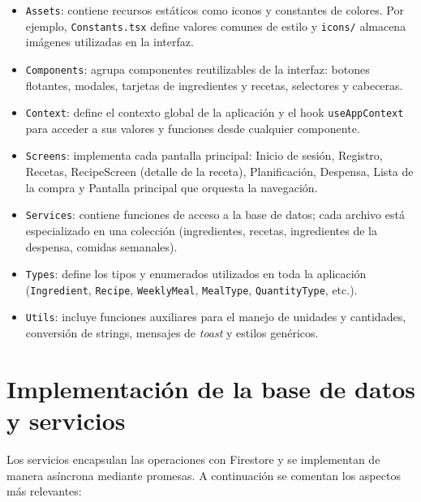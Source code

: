 \documentclass[twoside, openright, 11pt]{report}
\begin{document}
\begin{itemize}
  \item \texttt{Assets}: contiene recursos estáticos como iconos y constantes de colores. Por ejemplo, \texttt{Constants.tsx} define valores comunes de estilo y \texttt{icons/} almacena imágenes utilizadas en la interfaz.
  \item \texttt{Components}: agrupa componentes reutilizables de la interfaz: botones flotantes, modales, tarjetas de ingredientes y recetas, selectores y cabeceras.
  \item \texttt{Context}: define el contexto global de la aplicación y el hook \texttt{useAppContext} para acceder a sus valores y funciones desde cualquier componente.
  \item \texttt{Screens}: implementa cada pantalla principal: Inicio de sesión, Registro, Recetas, RecipeScreen (detalle de la receta), Planificación, Despensa, Lista de la compra y Pantalla principal que orquesta la navegación.
  \item \texttt{Services}: contiene funciones de acceso a la base de datos; cada archivo está especializado en una colección (ingredientes, recetas, ingredientes de la despensa, comidas semanales).
  \item \texttt{Types}: define los tipos y enumerados utilizados en toda la aplicación (\texttt{Ingredient}, \texttt{Recipe}, \texttt{WeeklyMeal}, \texttt{MealType}, \texttt{QuantityType}, etc.).
  \item \texttt{Utils}: incluye funciones auxiliares para el manejo de unidades y cantidades, conversión de strings, mensajes de \emph{toast} y estilos genéricos.
\end{itemize}

\section{Implementación de la base de datos y servicios}
Los servicios encapsulan las operaciones con Firestore y se implementan de manera asíncrona mediante promesas. A continuación se comentan los aspectos más relevantes:
\end{document}
